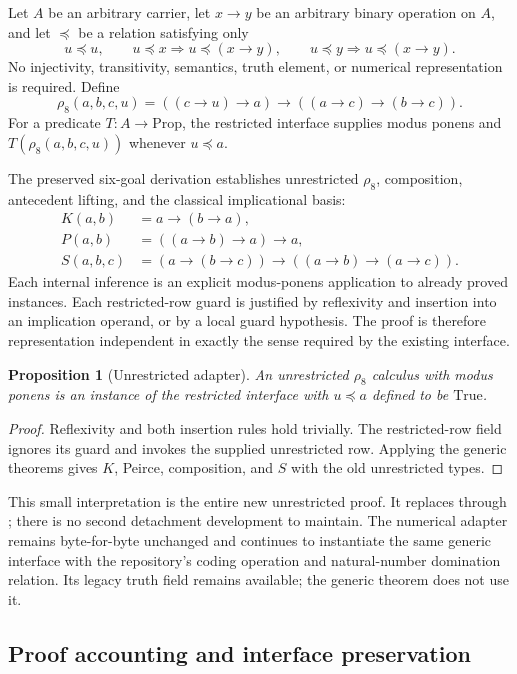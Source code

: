 \documentclass[11pt,letterpaper]{article}
\newtheorem{proposition}[theorem]{Proposition}
\newcommand{\code}[1]{\texttt{\detokenize{#1}}}
\begin{document}
Let $A$ be an arbitrary carrier, let $x\to y$ be an arbitrary binary operation on
$A$, and let $\preceq$ be a relation satisfying only
\[
 u\preceq u,\qquad
 u\preceq x\Longrightarrow u\preceq(x\to y),\qquad
 u\preceq y\Longrightarrow u\preceq(x\to y).
\]
No injectivity, transitivity, semantics, truth element, or numerical representation
is required. Define
\[
 \rho_8(a,b,c,u)=((c\to u)\to a)\to((a\to c)\to(b\to c)).
\]
For a predicate $T:A\to\mathrm{Prop}$, the restricted interface supplies modus
ponens and $T(\rho_8(a,b,c,u))$ whenever $u\preceq a$.

The preserved six-goal derivation establishes unrestricted $\rho_8$, composition,
antecedent lifting, and the classical implicational basis:
\begin{align*}
 K(a,b)&=a\to(b\to a),\\
 P(a,b)&=((a\to b)\to a)\to a,\\
 S(a,b,c)&=(a\to(b\to c))\to((a\to b)\to(a\to c)).
\end{align*}
Each internal inference is an explicit modus-ponens application to already proved
instances. Each restricted-row guard is justified by reflexivity and insertion
into an implication operand, or by a local guard hypothesis. The proof is therefore
representation independent in exactly the sense required by the existing interface.

\begin{proposition}[Unrestricted adapter]
An unrestricted $\rho_8$ calculus with modus ponens is an instance of the restricted
interface with $u\preceq a$ defined to be $\mathrm{True}$.
\end{proposition}
\begin{proof}
Reflexivity and both insertion rules hold trivially. The restricted-row field
ignores its guard and invokes the supplied unrestricted row. Applying the generic
theorems gives $K$, Peirce, composition, and $S$ with the old unrestricted types.
\end{proof}

This small interpretation is the entire new unrestricted proof. It replaces
\code{cd_0} through \code{cd_106}; there is no second detachment development to
maintain. The numerical adapter remains byte-for-byte unchanged and continues to
instantiate the same generic interface with the repository's coding operation and
natural-number domination relation. Its legacy truth field remains available;
the generic theorem does not use it.

\subsection{Proof accounting and interface preservation}
\end{document}
